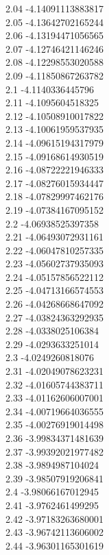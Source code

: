 {2.04	-4.14091113883817\\
2.05	-4.13642702165244\\
2.06	-4.13194471056565\\
2.07	-4.12746421146246\\
2.08	-4.12298553020588\\
2.09	-4.11850867263782\\
2.1	-4.1140336445796\\
2.11	-4.1095604518325\\
2.12	-4.10508910017822\\
2.13	-4.10061959537935\\
2.14	-4.09615194317979\\
2.15	-4.09168614930519\\
2.16	-4.08722221946333\\
2.17	-4.08276015934447\\
2.18	-4.07829997462176\\
2.19	-4.07384167095152\\
2.2	-4.06938525397358\\
2.21	-4.06493072931161\\
2.22	-4.06047810257335\\
2.23	-4.05602737935093\\
2.24	-4.05157856522112\\
2.25	-4.04713166574553\\
2.26	-4.04268668647092\\
2.27	-4.03824363292935\\
2.28	-4.0338025106384\\
2.29	-4.0293633251014\\
2.3	-4.0249260818076\\
2.31	-4.02049078623231\\
2.32	-4.01605744383711\\
2.33	-4.01162606007001\\
2.34	-4.00719664036555\\
2.35	-4.00276919014498\\
2.36	-3.99834371481639\\
2.37	-3.99392021977482\\
2.38	-3.9894987104024\\
2.39	-3.98507919206841\\
2.4	-3.98066167012945\\
2.41	-3.9762461499295\\
2.42	-3.97183263680001\\
2.43	-3.96742113606002\\
2.44	-3.96301165301619\\
}
